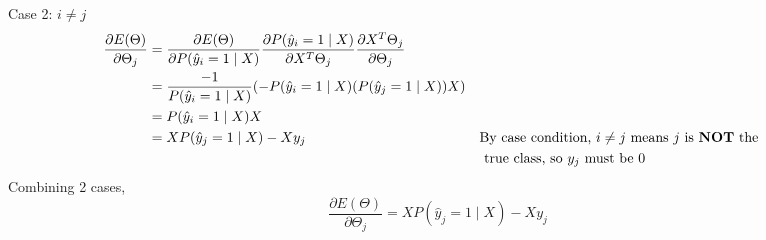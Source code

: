 \documentclass[12pt]{article}
\begin{document}
Case 2: $i \neq j$
\begin{align*}
\dfrac{\partial E(\Theta)}{\partial\Theta_{j}} &= \dfrac{\partial E(\Theta)}{\partial P(\hat{y}_{i} = 1 \mid X)} \dfrac{\partial P(\hat{y}_{i} = 1\mid X)}{\partial X^{T}\Theta_{j}} \dfrac{\partial X^{T}\Theta_{j}}{\partial \Theta_{j}}\\
&= \frac{-1}{P(\hat{y}_{i} = 1 \mid X)}(- P(\hat{y}_{i} = 1\mid X)(P(\hat{y}_{j} = 1\mid X))X)\\
&= P(\hat{y}_{i} = 1\mid X) X\\
&= XP(\hat{y}_{j} = 1\mid X) - Xy_{j} &&\text{By case condition, } i \neq j \text{ means } j \text{ is \textbf{NOT} the} \\&&& \text{ true class, so } y_{j} \text{ must be 0}\\
\end{align*}
Combining 2 cases,
\[ \dfrac{\partial E(\Theta)}{\partial\Theta_{j}} = XP(\hat{y}_{j} = 1\mid X) - Xy_{j}\]
\end{document}
